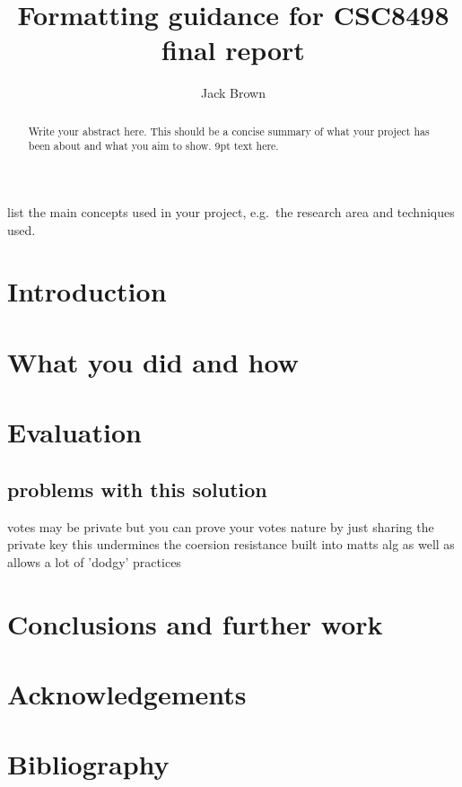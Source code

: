 \documentclass{entcs}
\begin{document}
\begin{frontmatter}

\title{Formatting guidance for CSC8498 final report}
\author{Jack Brown}
  \address{School of Computing Science, Newcastle University, UK} 

\begin{abstract} 
Write your abstract here. This should be a concise summary of what your project has been about and what you aim to show. 9pt text here.
\end{abstract}

\begin{keyword}
list the main concepts used in your project, e.g.\ the research area and techniques used.
\end{keyword}
\end{frontmatter}

\section{Introduction}\label{sec: introduction}

\section{What you did and how}
\cite{BTCWhitepaper}

\section{Evaluation}

\subsection{problems with this solution}
votes may be private but you can prove your votes nature by just sharing the private key this undermines the coersion resistance built into matts alg as well as allows a lot of 'dodgy' practices


\section{Conclusions and further work}

\section{Acknowledgements}

\section{Bibliography}
\printbibliography
\end{document}
